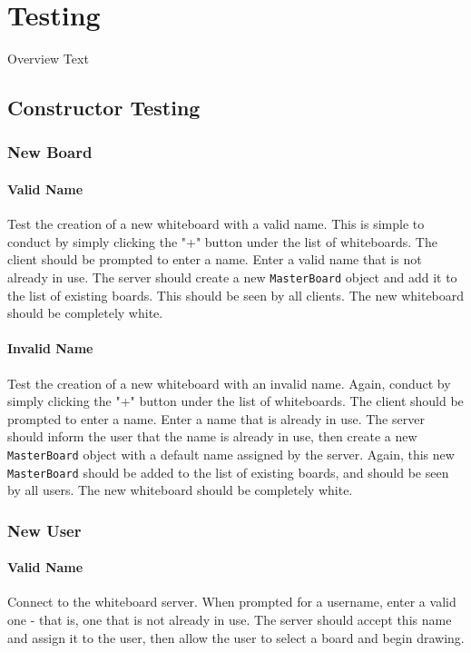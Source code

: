 \section{Testing}
Overview Text

\subsection{Constructor Testing}

\subsubsection{New Board} 

\paragraph{Valid Name}
Test the creation of a new whiteboard with a valid name. This is simple to conduct by simply clicking the "+" button under the list of whiteboards. The client should be prompted to enter a name. Enter a valid name that is not already in use. The server should create a new \texttt{MasterBoard} object and add it to the list of existing boards.  This should be seen by all clients. The new whiteboard should be completely white.

\paragraph{Invalid Name}
Test the creation of a new whiteboard with an invalid name. Again, conduct by simply clicking the "+" button under the list of whiteboards. The client should be prompted to enter a name. Enter a name that is already in use. The server should inform the user that the name is already in use, then create a new \texttt{MasterBoard} object with a default name assigned by the server. Again, this new \texttt{MasterBoard} should be added to the list of existing boards, and should be seen by all users. The new whiteboard should be completely white.

\subsubsection{New User}

\paragraph{Valid Name}
Connect to the whiteboard server.  When prompted for a username, enter a valid one - that is, one that is not already in use.  The server should accept this name and assign it to the user, then allow the user to select a board and begin drawing.

